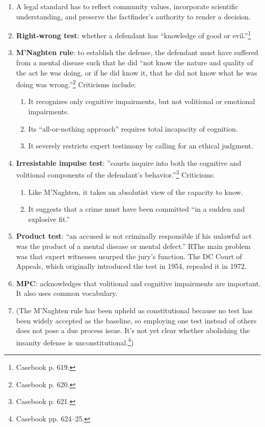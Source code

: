\begin{enumerate}
    \item A legal standard has to reflect community values, incorporate scientific understanding, and preserve the factfinder's authority to render a decision.
    \item \textbf{Right-wrong test}: whether a defendant has ``knowledge of good or evil.''\footnote{Casebook p. 619.}
    \item \textbf{M'Naghten rule}: to establish the defense, the defendant must have suffered from a mental disease such that he did ``not know the nature and quality of the act he was doing, or if he did know it, that he did not know what he was doing was wrong.''\footnote{Casebook p. 620.} Criticisms include:
    \begin{enumerate}
        \item It recognizes only cognitive impairments, but not volitional or emotional impairments.
        \item Its ``all-or-nothing approach'' requires total incapacity of cognition.
        \item It severely restricts expert testimony by calling for an ethical judgment.
    \end{enumerate}
    \item \textbf{Irresistable impulse test}: ''courts inquire into both the cognitive and volitional components of the defendant's behavior.''\footnote{Casebook p. 621.} Criticisms:
    \begin{enumerate}
        \item Like M'Naghten, it takes an absolutist view of the capacity to know.
        \item It suggests that a crime must have been committed ``in a sudden and explosive fit.''
    \end{enumerate}
    \item \textbf{Product test}: ``an accused is not criminally responsible if his unlawful act was the product of a mental disease or mental defect.'' RThe main problem was that expert witnesses usurped the jury's function. The DC Court of Appeals, which originally introduced the test in 1954, repealed it in 1972.
    \item \textbf{MPC}: acknowledges that volitional and cognitive impairments are important. It also uses common vocabulary.
    \item (The M'Naghten rule has been upheld as constitutional because no test has been widely accepted as the baseline, so employing one test instead of others does not pose a due process issue. It's not yet clear whether abolishing the insanity defense is unconstitutional.\footnote{Casebook pp. 624--25.})
\end{enumerate}

